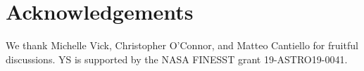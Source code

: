 \documentclass[
        fleqn,
        usenatbib,
    ]{mnras}
\begin{document}
\section{Acknowledgements}

We thank Michelle Vick, Christopher O'Connor, and Matteo Cantiello for fruitful
discussions. YS is supported by the NASA FINESST grant 19-ASTRO19-0041.





\bsp
\label{lastpage} %
\end{document}
